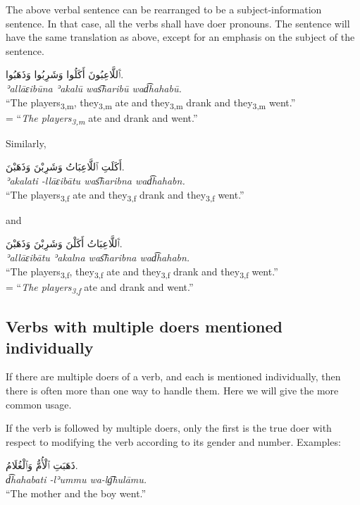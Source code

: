 \documentclass[
  10pt,
]{book}
\begin{document}
The above verbal sentence can be rearranged to be a subject-information sentence. In that case, all the verbs shall have doer pronouns. The sentence will have the same translation as above, except for an emphasis on the subject of the sentence.

\foreignlanguage{arabic}{ٱَللَّاعِبُونَ أَکَلُوا وَشَرِبُوا وَذَهَبُوا.}\\
\emph{ʾallāɛibūna ʾakalū was͡haribū wad͡hahabū.}\\
\enquote{The players\textsubscript{3,m}, they\textsubscript{3,m} ate and they\textsubscript{3,m} drank and they\textsubscript{3,m} went.}\\
= \enquote{\emph{The players\textsubscript{3,m}} ate and drank and went.}

Similarly,

\foreignlanguage{arabic}{أَکَلَتِ ٱللَّاعِبَاتُ وَشَرِبْنَ وَذَهَبْنَ.}\\
\emph{ʾakalati -llāɛibātu was͡haribna wad͡hahabn.}\\
\enquote{The players\textsubscript{3,f} ate and they\textsubscript{3,f} drank and they\textsubscript{3,f} went.}

and

\foreignlanguage{arabic}{ٱَللَّاعِبَاتُ أَکَلْنَ وَشَرِبْنَ وَذَهَبْنَ.}\\
\emph{ʾallāɛibātu ʾakalna was͡haribna wad͡hahabn.}\\
\enquote{The players\textsubscript{3,f}, they\textsubscript{3,f} ate and they\textsubscript{3,f} drank and they\textsubscript{3,f} went.}\\
= \enquote{\emph{The players\textsubscript{3,f}} ate and drank and went.}

\subsection{Verbs with multiple doers mentioned individually}\label{verbs-with-multiple-doers-mentioned-individually}

If there are multiple doers of a verb, and each is mentioned individually, then there is often more than one way to handle them. Here we will give the more common usage.

If the verb is followed by multiple doers, only the first is the true doer with respect to modifying the verb according to its gender and number. Examples:

\foreignlanguage{arabic}{ذَهَبَتِ ٱلْأُمُّ وَٱلْغُلَامُ.}\\
\emph{d͡hahabati -lʾummu wa-lg͡hulāmu.}\\
\enquote{The mother and the boy went.}
\end{document}
